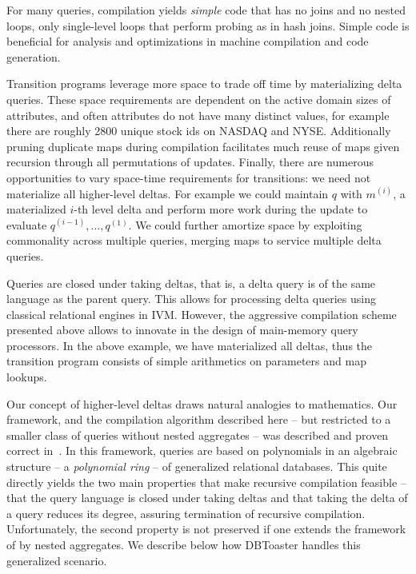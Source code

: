 For many queries, compilation yields \textit{simple} code that has no joins
and no nested loops, only single-level loops that perform probing as
in hash joins.
Simple code is beneficial for analysis and optimizations in machine
compilation and code generation.

Transition programs leverage more space to trade off time by materializing delta
queries. These space requirements are dependent on the active domain sizes of
attributes, and often attributes do not have many distinct values, for example
there are roughly 2800 unique stock ids on NASDAQ and NYSE. Additionally pruning
duplicate maps during compilation facilitates much reuse of maps given recursion
through all permutations of updates. Finally, there are numerous opportunities
to vary space-time requirements for transitions: we need not materialize all
higher-level deltas. For example we could maintain $q$ with $m^{(i)}$, a
materialized $i$-th level delta and perform more work during the update to
evaluate $q^{(i-1)}, \ldots, q^{(1)}$. We could further amortize space by
exploiting commonality across multiple queries, merging maps to service multiple
delta queries.



Queries are closed under taking deltas, that is, a delta query is of the same
language as the parent query. This allows for processing delta queries using
classical relational engines in IVM.
However, the aggressive compilation scheme presented above allows to innovate in
the design of main-memory query processors.
In the above example, we have materialized all
deltas, thus the transition program consists of simple arithmetics on parameters
and map lookups.

Our concept of higher-level deltas draws natural analogies to
mathematics. Our framework, and the compilation algorithm described here
-- but restricted to a smaller class of queries without nested aggregates
-- was described and proven correct in~\cite{koch-pods:10}.
In this framework, queries are based on polynomials in an
algebraic structure -- a {\em polynomial ring} --
of generalized relational databases.
This quite directly yields the two main properties that make recursive
compilation feasible -- that the query language is closed under taking deltas
and that taking the delta of a query reduces its degree, assuring termination of
recursive compilation.
Unfortunately, the second property is not preserved if one extends the
framework of \cite{koch-pods:10} by nested aggregates. We describe below
how DBToaster handles this generalized scenario.

